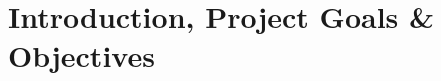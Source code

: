 \section{Introduction, Project Goals \& Objectives}
\FloatBarrier %











\iffalse
The purpose of this experiment is to investigate the behaviour of a mild steel portal frame model when subjected to increasing loads.

The rig consists of a loading system that applies a vertical load at the center of the beam and a horizontal load at the top of one column. As shown in \autoref{f0}.

\begin{figure}[htbp]
    \centering
    \texttt{[image: ./fig/00.jpg]}
    \caption{Experimental procedure}
    \label{f0}
\end{figure}

\fi


